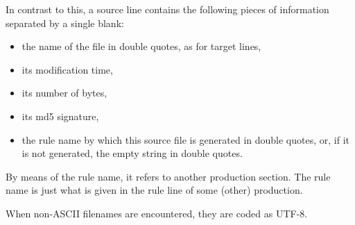 \documentclass[a4paper, english]{article}%
\begin{document}
In contrast to this, a source line contains the following pieces of information 
separated by a single blank: 
%
\begin{itemize}
  \item the name of the file in double quotes, as for target lines, 
  \item its modification time, 
  \item its number of bytes, 
  \item its md5 signature, 
  \item the rule name by which this source file is generated in double quotes, 
  or, if it is not generated, the empty string in double quotes. 
\end{itemize}

By means of the rule name, it refers to another production section. 
The rule name is just what is given in the rule line of some (other) production. 


When non-ASCII filenames are encountered, they are coded as UTF-8.



{}%
\end{document}

